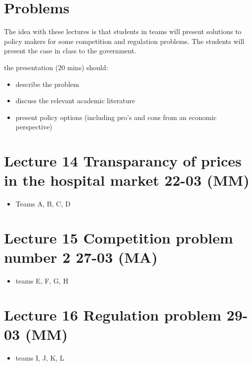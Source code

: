 \documentclass[]{book}
\providecommand{\tightlist}{%
  \setlength{\itemsep}{0pt}\setlength{\parskip}{0pt}}
\begin{document}
\section{Problems}\label{problems}

The idea with these lectures is that students in teams will present
solutions to policy makers for some competition and regulation problems.
The students will present the case in class to the government.

the presentation (20 mins) should:

\begin{itemize}
\tightlist
\item
  describe the problem
\item
  discuss the relevant academic literature
\item
  present policy options (including pro's and cons from an economic
  perspective)
\end{itemize}

\section{Lecture 14 Transparancy of prices in the hospital market 22-03
(MM)}\label{lecture-14-transparancy-of-prices-in-the-hospital-market-22-03-mm}

\begin{itemize}
\tightlist
\item
  Teams A, B, C, D
\end{itemize}

\section{Lecture 15 Competition problem number 2 27-03
(MA)}\label{lecture-15-competition-problem-number-2-27-03-ma}

\begin{itemize}
\tightlist
\item
  teams E, F, G, H
\end{itemize}

\section{Lecture 16 Regulation problem 29-03
(MM)}\label{lecture-16-regulation-problem-29-03-mm}

\begin{itemize}
\tightlist
\item
  teams I, J, K, L
\end{itemize}
\end{document}
